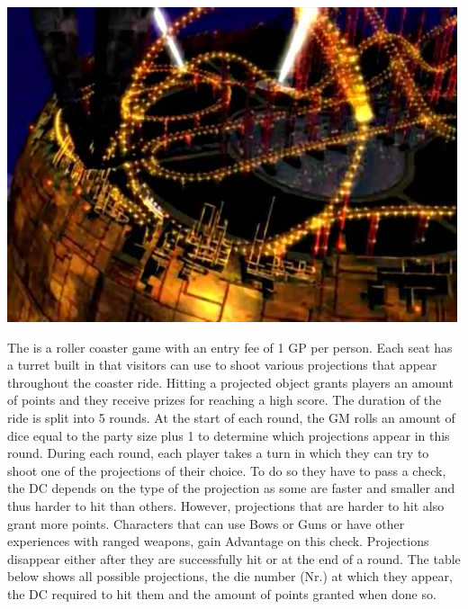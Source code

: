 %
%
%
%
%
%
%
\begin{center} \includegraphics[width=\columnwidth]{./art/goldsaucer/shootingcoaster.jpg} \end{center}
The  is a roller coaster game with an entry fee of 1 GP per person.
Each seat has a turret built in that visitors can use to shoot various projections that appear throughout the coaster ride.
Hitting a projected object grants players an amount of points and they receive prizes for reaching a high score.
The duration of the ride is split into 5 rounds. 
At the start of each round, the GM rolls an amount of dice equal to the party size plus 1 to determine which projections appear in this round. 
During each round, each player takes a turn in which they can try to shoot one of the projections of their choice.
To do so they have to pass a check, the DC depends on the type of the projection as some are faster and smaller and thus harder to hit than others. 
However, projections that are harder to hit also grant more points.
Characters that can use Bows or Guns or have other experiences with ranged weapons, gain Advantage on this check.
Projections disappear either after they are successfully hit or at the end of a round.
The table below shows all possible projections, the die number (Nr.) at which they appear, the DC required to hit them and the amount of points granted when done so.
%
\\\\
%
